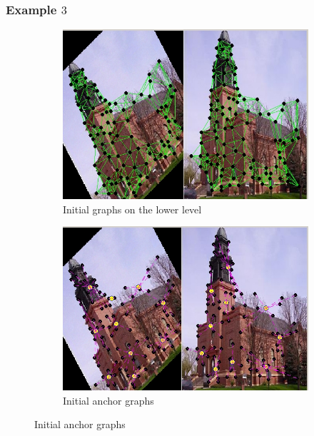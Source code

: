 \documentclass[
	fontsize=12pt,
	paper=a4,
	twoside=false,
	numbers=noenddot,
	plainheadsepline,
	toc=listof,
	toc=bibliography
]{scrartcl}
\begin{document}
\subsubsection{Example $3$}

\begin{figure}[h] 
	\begin{subfigure}[b]{0.5\textwidth}
		\centering
		\includegraphics[scale=0.35]{fig/method2/test_imagetrafo3/initial_graphs.jpg} 
		\caption{Initial graphs on the lower level} 
	\end{subfigure}%
	\begin{subfigure}[b]{0.5\textwidth}
		\centering
		\includegraphics[scale=0.35]{fig/method2/test_imagetrafo3/initial_anchorgraphs.jpg} 
		\caption{Initial anchor graphs} 
	\end{subfigure} 
	

\end{figure}
\end{document}
